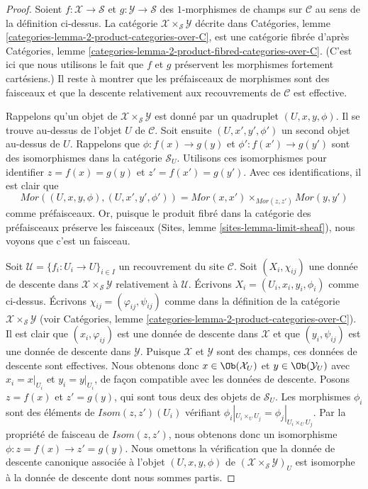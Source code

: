 \begin{proof}
Soient $f : \mathcal{X} \to \mathcal{S}$ et
$g : \mathcal{Y} \to \mathcal{S}$ des
$1$-morphismes de champs sur $\mathcal{C}$
au sens de la définition ci-dessus. La catégorie
$\mathcal{X} \times_\mathcal{S} \mathcal{Y}$
décrite dans
Catégories, lemme \ref{categories-lemma-2-product-categories-over-C}, est une
catégorie fibrée d'après
Catégories, lemme \ref{categories-lemma-2-product-fibred-categories-over-C}.
(C'est ici que nous utilisons le fait que $f$ et $g$ préservent les morphismes
fortement cartésiens.) Il reste à montrer que les préfaisceaux de morphismes sont des faisceaux
et que la descente relativement aux recouvrements de $\mathcal{C}$ est effective.

\medskip\noindent
Rappelons qu'un objet de $\mathcal{X} \times_\mathcal{S} \mathcal{Y}$
est donné par un quadruplet $(U, x, y, \phi)$.
Il se trouve au-dessus de l'objet
$U$ de $\mathcal{C}$. Soit ensuite $(U, x', y', \phi')$ un second
objet au-dessus de $U$.
Rappelons que $\phi : f(x) \to g(y)$ et $\phi' : f(x') \to g(y')$
sont des isomorphismes dans la catégorie $\mathcal{S}_U$. Utilisons ces
isomorphismes pour identifier $z = f(x) = g(y)$ et
$z' = f(x') = g(y')$. Avec ces identifications,
il est clair que
$$
\mathit{Mor}((U, x, y, \phi), (U, x', y', \phi'))
=
\mathit{Mor}(x, x')
\times_{\mathit{Mor}(z, z')}
\mathit{Mor}(y, y')
$$
comme préfaisceaux. Or, puisque le produit fibré dans la catégorie des
préfaisceaux préserve les faisceaux (Sites, lemme \ref{sites-lemma-limit-sheaf}),
nous voyons que c'est un faisceau.

\medskip\noindent
Soit $\mathcal{U} = \{f_i : U_i \to U\}_{i \in I}$ un recouvrement du site
$\mathcal{C}$. Soit $(X_i, \chi_{ij})$ une donnée de descente
dans $\mathcal{X} \times_\mathcal{S} \mathcal{Y}$ relativement à $\mathcal{U}$.
Écrivons $X_i = (U_i, x_i, y_i, \phi_i)$ comme ci-dessus. Écrivons
$\chi_{ij} = (\varphi_{ij}, \psi_{ij})$ comme dans la définition de
la catégorie $\mathcal{X} \times_\mathcal{S} \mathcal{Y}$ (voir
Catégories, lemme \ref{categories-lemma-2-product-categories-over-C}).
Il est clair que $(x_i, \varphi_{ij})$ est une donnée de descente dans
$\mathcal{X}$ et que $(y_i, \psi_{ij})$ est une donnée de descente dans
$\mathcal{Y}$. Puisque $\mathcal{X}$ et $\mathcal{Y}$ sont des champs, ces
données de descente sont effectives. Nous obtenons donc
$x \in \Ob(\mathcal{X}_U)$ et $y \in \Ob(\mathcal{Y}_U)$
avec $x_i = x|_{U_i}$ et $y_i = y|_{U_i}$, de façon compatible avec les données de descente.
Posons $z = f(x)$ et $z' = g(y)$, qui sont tous deux des objets de $\mathcal{S}_U$.
Les morphismes $\phi_i$ sont des éléments de
$\mathit{Isom}(z, z')(U_i)$ vérifiant
$\phi_i|_{U_i \times_U U_j} = \phi_j|_{U_i \times_U U_j}$.
Par la propriété de faisceau de $\mathit{Isom}(z, z')$,
nous obtenons donc un isomorphisme $\phi : z = f(x) \to z' = g(y)$.
Nous omettons la vérification que la donnée de descente canonique associée à
l'objet $(U, x, y, \phi)$ de
$(\mathcal{X} \times_\mathcal{S} \mathcal{Y})_U$ est isomorphe
à la donnée de descente dont nous sommes partis.
\end{proof}

